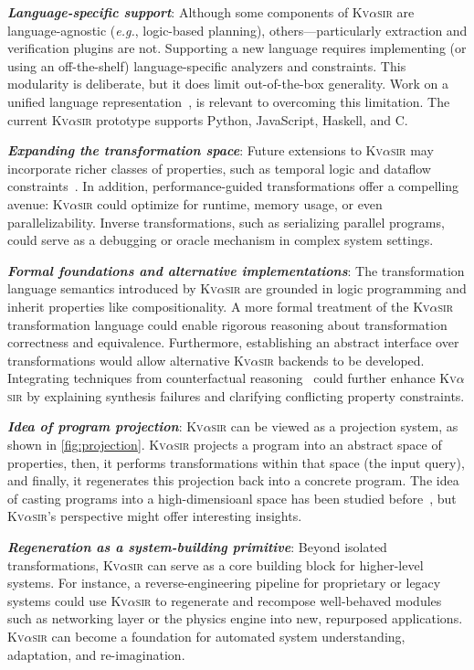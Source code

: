 \documentclass[nonacm,sigplan,review]{acmart}
\def\eg{{\em e.g.}, }
\newcommand{\sys}{{\scshape Kv{$\alpha$}sir}\xspace}
\newcommand{\heading}[1]{\vspace{2pt}\noindent\textbf{\emph{#1}}:\enspace}
\begin{document}
\heading{Language-specific support}
Although some components of \sys are language-agnostic (\eg logic-based planning),
others---particularly extraction and verification plugins are not.
Supporting a new language
requires implementing (or using an off-the-shelf) language-specific analyzers and constraints.
This modularity is deliberate,
but it does limit out-of-the-box generality.
Work on a unified language representation~\cite{koppel2018onetool,bap2011,dillig2009sail},
is relevant to overcoming this limitation.
The current \sys prototype
supports Python, JavaScript, Haskell, and C. 

\heading{Expanding the transformation space}
Future extensions to \sys may incorporate richer classes of properties, such as
temporal logic and dataflow
constraints~\cite{azzopardi2023ltl,handa2021orderawaredataflowmodelparallel}.
In addition, performance-guided transformations offer a compelling avenue: \sys
could optimize for runtime, memory usage, or even parallelizability.
Inverse
transformations, such as serializing parallel programs, could serve as
a debugging or oracle mechanism in complex system settings.

\heading{Formal foundations and alternative implementations}
The transformation language semantics introduced by \sys are grounded in logic
programming and inherit properties like compositionality.
A more formal treatment of the \sys
transformation language could enable rigorous reasoning about transformation
correctness and equivalence.
Furthermore, establishing an abstract interface
over transformations would allow alternative \sys backends to be developed.
Integrating techniques from
counterfactual reasoning~\cite{Cabalar_2020} could further enhance \sys by
explaining synthesis failures and clarifying conflicting property constraints.

\heading{Idea of program projection}
\sys can be viewed as a projection system, as shown in \cref{fig:projection}.
\sys projects a program into an abstract space of properties, 
then, it performs transformations within that space (the input query),
and finally, it regenerates this projection back into a concrete program.
The idea of casting programs into a high-dimensioanl space has been studied before~\cite{ben-nun2018neural,alon2019code2vec,ellis2020dreamcoder,nye2021platypus},
but \sys's perspective might offer interesting insights.

\heading{Regeneration as a system-building primitive}
Beyond isolated transformations, \sys can serve as a core building block for
higher-level systems.
For instance, a reverse-engineering pipeline for
proprietary or legacy systems could use \sys to regenerate and recompose
well-behaved modules such as networking layer or the physics engine into new,
repurposed applications.
\sys can become a foundation for automated system understanding, adaptation, and re-imagination.
\end{document}
